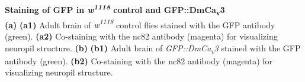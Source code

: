 \label{fig:S1} 
\textbf{Staining of GFP in \emph{w\textsuperscript{1118}} control and GFP::DmCa\textsubscript{v}3}
\\ 
\textbf{(a)} \textbf{(a1)} Adult brain of \emph{w\textsuperscript{1118}} control flies stained with the GFP antibody (green).
\textbf{(a2)} Co-staining with the nc82 antibody (magenta) for visualizing neuropil structure.
\textbf{(b)} \textbf{(b1)} Adult brain of \emph{GFP::DmCa\textsubscript{v}3} stained with the GFP antibody (green).
\textbf{(b2)} Co-staining with the nc82 antibody (magenta) for visualizing neuropil structure.